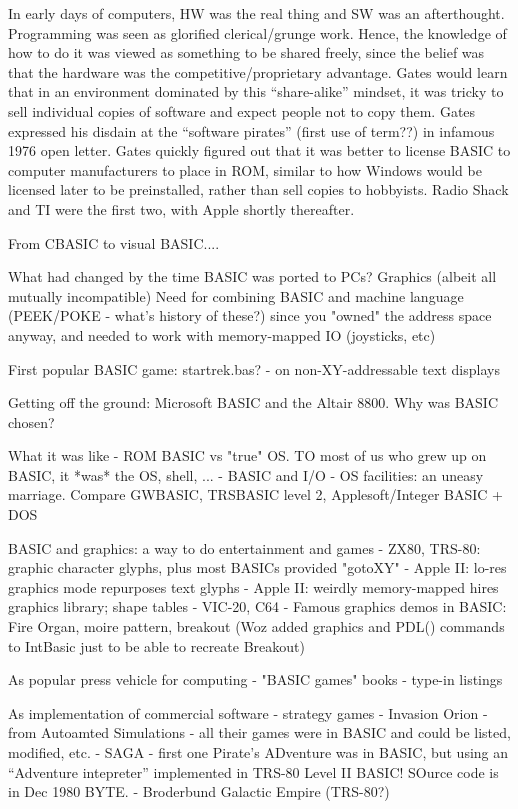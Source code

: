 \documentclass{article}
\begin{document}
In early days of computers, HW was the real thing and SW was an
afterthought.  Programming was seen as glorified clerical/grunge work.
Hence, the knowledge of how to do it was viewed as something to be
shared freely, since the belief was that the hardware was the
competitive/proprietary advantage.
Gates would learn that in an environment dominated by this
``share-alike'' mindset, it was
tricky to sell individual copies of software and expect people not to
copy them.  Gates
expressed his disdain at the ``software pirates'' (first use of term??) in infamous
1976 open letter.
Gates quickly figured out that it was better to license BASIC to
computer manufacturers to place in ROM, similar to how Windows would be
licensed later to be preinstalled, rather than sell copies to
hobbyists.  Radio Shack and TI were the first two, with Apple shortly
thereafter.  

From CBASIC to visual BASIC....


What had changed by the time BASIC was ported to PCs?
   Graphics (albeit all mutually incompatible)
   Need for combining BASIC and machine language (PEEK/POKE - what's
   history of these?) since you "owned" the address space anyway, and
   needed to work with memory-mapped IO (joysticks, etc)

First popular BASIC game: startrek.bas?
  - on non-XY-addressable text displays

Getting off the ground: Microsoft BASIC and the Altair 8800.  Why was
    BASIC chosen?

What it was like
  - ROM BASIC vs "true" OS.  TO most of us who grew up on BASIC, it
  *was* the OS, shell, ...
  - BASIC and I/O - OS facilities: an uneasy marriage.  Compare GWBASIC,
  TRSBASIC level 2, Applesoft/Integer BASIC + DOS

BASIC and graphics: a way to do entertainment and games
  - ZX80, TRS-80: graphic character glyphs, plus most BASICs provided "gotoXY"
  - Apple II: lo-res graphics mode repurposes text glyphs
  - Apple II: weirdly memory-mapped hires graphics library; shape tables
  - VIC-20, C64
  - Famous graphics demos in BASIC: Fire Organ, moire pattern, breakout
  (Woz added graphics and PDL() commands to IntBasic just to be able to
  recreate Breakout)

As popular press vehicle for computing
  - "BASIC games" books
  - type-in listings

As implementation of commercial software - strategy games
  - Invasion Orion - from Autoamted Simulations - all their games were
  in BASIC and could be listed, modified, etc.
  - SAGA - first one Pirate's ADventure was in BASIC, but using an
  ``Adventure intepreter'' implemented in TRS-80 Level II BASIC!  SOurce
  code is in Dec 1980 BYTE.
  - Broderbund Galactic Empire (TRS-80?)
\end{document}
